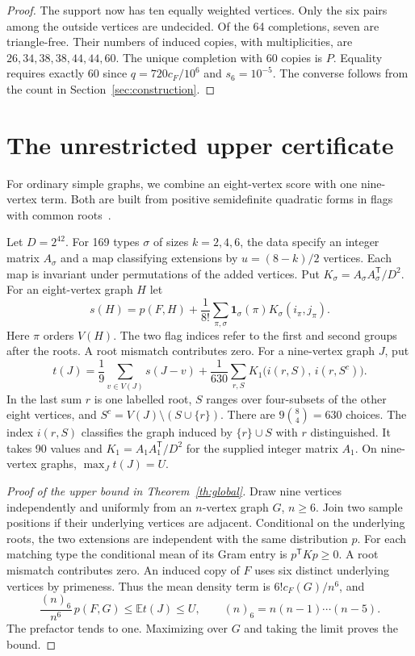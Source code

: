 \documentclass[11pt,a4paper]{article}
\newcommand{\E}{\mathbb E}
\newcommand{\one}{\mathbf 1}
\newcommand{\trans}{\mathsf T}
\begin{document}
\begin{proof}
The support now has ten equally weighted vertices. Only the six pairs among the outside vertices are undecided. Of the 64 completions, seven are triangle-free. Their numbers of induced copies, with multiplicities, are \(26,34,38,38,44,44,60\). The unique completion with 60 copies is \(P\). Equality requires exactly 60 since \(q=720c_F/10^6\) and \(s_6=10^{-5}\). The converse follows from the count in Section~\ref{sec:construction}.
\end{proof}

\section{The unrestricted upper certificate}\label{sec:upper}

For ordinary simple graphs, we combine an eight-vertex score with one nine-vertex term. Both are built from positive semidefinite quadratic forms in flags with common roots~\cite{raz}.

Let \(D=2^{42}\). For 169 types \(\sigma\) of sizes \(k=2,4,6\), the data specify an integer matrix \(A_\sigma\) and a map classifying extensions by \(u=(8-k)/2\) vertices. Each map is invariant under permutations of the added vertices. Put \(K_\sigma=A_\sigma A_\sigma^{\trans}/D^2\). For an eight-vertex graph \(H\) let
\[
 s(H)=p(F,H)+\frac1{8!}\sum_{\pi,\sigma}
       \one_\sigma(\pi) K_\sigma(i_\pi,j_\pi).
\]
Here \(\pi\) orders \(V(H)\). The two flag indices refer to the first and second groups after the roots. A root mismatch contributes zero.
\newpage
For a nine-vertex graph \(J\), put
\begin{equation}\label{eq:nine}
 t(J)=\frac19\sum_{v\in V(J)}s(J-v)
  +\frac1{630}\sum_{r,S} K_1\big(i(r,S),\,i(r,S^{c})\big).
\end{equation}
In the last sum \(r\) is one labelled root, \(S\) ranges over four-subsets of the other eight vertices, and \(S^c=V(J)\setminus(S\cup\{r\})\). There are \(9\binom84=630\) choices. The index \(i(r,S)\) classifies the graph induced by \(\{r\}\cup S\) with \(r\) distinguished. It takes 90 values and \(K_1=A_1A_1^{\trans}/D^2\) for the supplied integer matrix \(A_1\). On nine-vertex graphs, \(\max_J t(J)=U\).

\begin{proof}[Proof of the upper bound in Theorem~\ref{th:global}]
Draw nine vertices independently and uniformly from an \(n\)-vertex graph \(G\), \(n\ge6\). Join two sample positions if their underlying vertices are adjacent. Conditional on the underlying roots, the two extensions are independent with the same distribution \(p\). For each matching type the conditional mean of its Gram entry is \(p^{\trans}Kp\ge0\). A root mismatch contributes zero. An induced copy of \(F\) uses six distinct underlying vertices by primeness. Thus the mean density term is \(6!c_F(G)/n^6\), and
\[
 \frac{(n)_6}{n^6}\,p(F,G)\le \E t(J)\le U,\qquad
 (n)_6=n(n-1)\cdots(n-5).
\]
The prefactor tends to one. Maximizing over \(G\) and taking the limit proves the bound.
\end{proof}
\end{document}

